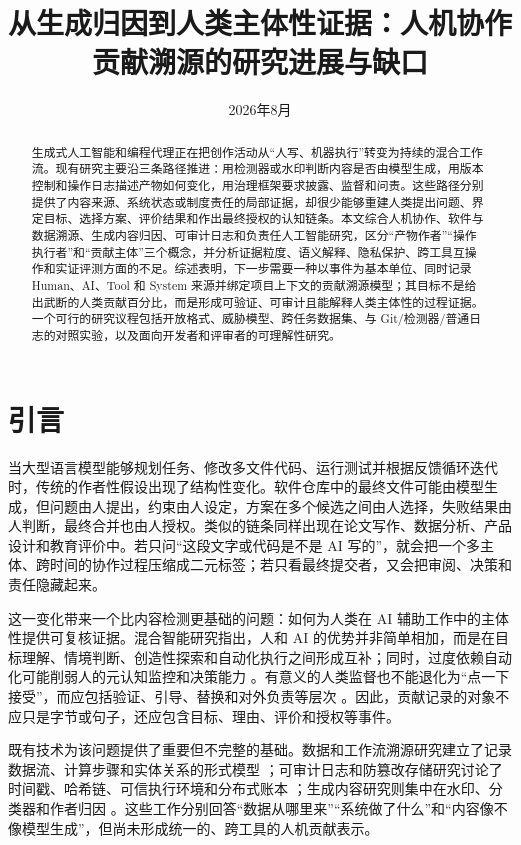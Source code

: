 \documentclass[UTF8,a4paper,12pt]{ctexart}
\title{从生成归因到人类主体性证据：人机协作贡献溯源的研究进展与缺口}
\author{}
\date{2026年8月}
\begin{document}
\maketitle

\begin{abstract}
生成式人工智能和编程代理正在把创作活动从“人写、机器执行”转变为持续的混合工作流。现有研究主要沿三条路径推进：用检测器或水印判断内容是否由模型生成，用版本控制和操作日志描述产物如何变化，用治理框架要求披露、监督和问责。这些路径分别提供了内容来源、系统状态或制度责任的局部证据，却很少能够重建人类提出问题、界定目标、选择方案、评价结果和作出最终授权的认知链条。本文综合人机协作、软件与数据溯源、生成内容归因、可审计日志和负责任人工智能研究，区分“产物作者”“操作执行者”和“贡献主体”三个概念，并分析证据粒度、语义解释、隐私保护、跨工具互操作和实证评测方面的不足。综述表明，下一步需要一种以事件为基本单位、同时记录 Human、AI、Tool 和 System 来源并绑定项目上下文的贡献溯源模型；其目标不是给出武断的人类贡献百分比，而是形成可验证、可审计且能解释人类主体性的过程证据。一个可行的研究议程包括开放格式、威胁模型、跨任务数据集、与 Git/检测器/普通日志的对照实验，以及面向开发者和评审者的可理解性研究。
\end{abstract}

\section{引言}
当大型语言模型能够规划任务、修改多文件代码、运行测试并根据反馈循环迭代时，传统的作者性假设出现了结构性变化。软件仓库中的最终文件可能由模型生成，但问题由人提出，约束由人设定，方案在多个候选之间由人选择，失败结果由人判断，最终合并也由人授权。类似的链条同样出现在论文写作、数据分析、产品设计和教育评价中。若只问“这段文字或代码是不是 AI 写的”，就会把一个多主体、跨时间的协作过程压缩成二元标签；若只看最终提交者，又会把审阅、决策和责任隐藏起来。

这一变化带来一个比内容检测更基础的问题：如何为人类在 AI 辅助工作中的主体性提供可复核证据。混合智能研究指出，人和 AI 的优势并非简单相加，而是在目标理解、情境判断、创造性探索和自动化执行之间形成互补；同时，过度依赖自动化可能削弱人的元认知监控和决策能力 \cite{hybridintelligencehuman2025,towardascience2026}。有意义的人类监督也不能退化为“点一下接受”，而应包括验证、引导、替换和对外负责等层次 \cite{designingmeaningfulhuman2026,ensuringhumanoversight2023,letmetake2021}。因此，贡献记录的对象不应只是字节或句子，还应包含目标、理由、评价和授权等事件。

既有技术为该问题提供了重要但不完整的基础。数据和工作流溯源研究建立了记录数据流、计算步骤和实体关系的形式模型 \cite{acorecalculus2012,acorecalculus2013,embeddingdataprovenance2016,sharinginteroperableworkflow2019}；可审计日志和防篡改存储研究讨论了时间戳、哈希链、可信执行环境和分布式账本 \cite{proggeranefficient2014,trustbutverify2023,teepatee2024,usingblockchainledgers2025}；生成内容研究则集中在水印、分类器和作者归因 \cite{authorshipattributionin2025,machinegeneratedtext2023,distinguishinghumanfrom2024,curvemarkdetectingai2025}。这些工作分别回答“数据从哪里来”“系统做了什么”和“内容像不像模型生成”，但尚未形成统一的、跨工具的人机贡献表示。
\end{document}

